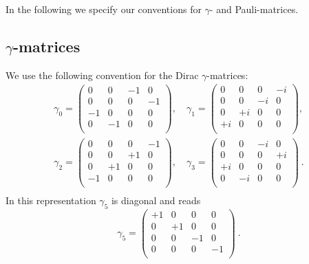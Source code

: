 \label{sec:gammas}

In the following we specify our conventions for $\gamma$- and
Pauli-matrices. 

\subsection{$\gamma$-matrices}

We use the following convention for the Dirac $\gamma$-matrices:
\[
\begin{split}
  \gamma_0 = \begin{pmatrix}
    0 & 0 & -1 & 0 \\
    0 & 0 & 0 & -1 \\
    -1 & 0 & 0 & 0 \\
    0 & -1 & 0 & 0 \\
  \end{pmatrix},\quad
  \gamma_1 = \begin{pmatrix}
    0 & 0 & 0 & -i \\
    0 & 0 & -i & 0 \\
    0 & +i & 0 & 0 \\
    +i & 0 & 0 & 0 \\    
  \end{pmatrix},\\
  \gamma_2 = \begin{pmatrix}
    0 & 0 & 0 & -1 \\
    0 & 0 & +1 & 0 \\
    0 & +1 & 0 & 0 \\
    -1 & 0 & 0 & 0 \\   
  \end{pmatrix},\quad
  \gamma_3 = \begin{pmatrix}
    0 & 0 & -i & 0 \\
    0 & 0 & 0 & +i \\
    +i & 0 & 0 & 0 \\
    0 & -i & 0 & 0 \\
  \end{pmatrix}\ .\\
\end{split}
\]
In this representation $\gamma_5$ is diagonal and reads
\[
  \gamma_5 =
  \begin{pmatrix}
    +1 & 0 & 0 & 0 \\
    0 & +1 & 0 & 0 \\
    0 & 0 & -1 & 0 \\
    0 & 0 & 0 & -1 \\    
  \end{pmatrix}\ .
\]

